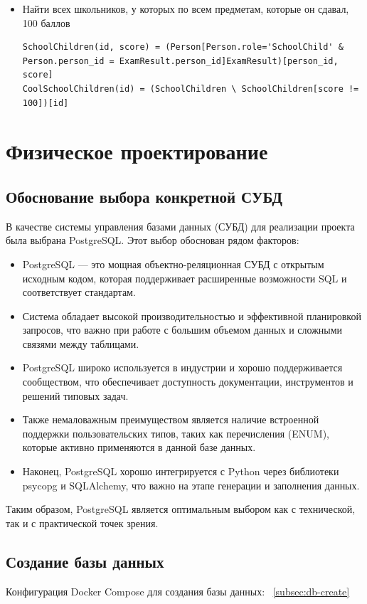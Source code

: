 \documentclass[a4paper]{article}
\begin{document}
\begin{itemize}
      \item Найти всех школьников, у которых по всем предметам, которые он сдавал, 100 баллов
            \begin{lstlisting}[basicstyle=\ttfamily\small, breaklines=true, frame=none, numbers=none]
SchoolChildren(id, score) = (Person[Person.role='SchoolChild' & Person.person_id = ExamResult.person_id]ExamResult)[person_id, score]
CoolSchoolChildren(id) = (SchoolChildren \ SchoolChildren[score != 100])[id]
            \end{lstlisting}
\end{itemize}


\section{Физическое проектирование}
\subsection{Обоснование выбора конкретной СУБД}
В качестве системы управления базами данных (СУБД) для реализации проекта была
выбрана PostgreSQL. Этот выбор обоснован рядом факторов:
\begin{itemize}
      \item PostgreSQL — это мощная объектно-реляционная СУБД с открытым исходным кодом, которая поддерживает расширенные возможности SQL и соответствует стандартам.
      \item Система обладает высокой производительностью и эффективной планировкой запросов, что важно при работе с большим объемом данных и сложными связями между таблицами.
      \item PostgreSQL широко используется в индустрии и хорошо поддерживается сообществом, что обеспечивает доступность документации, инструментов и решений типовых задач.
      \item Также немаловажным преимуществом является наличие встроенной поддержки пользовательских типов, таких как перечисления (ENUM), которые активно применяются в данной базе данных.
      \item Наконец, PostgreSQL хорошо интегрируется с Python через библиотеки psycopg и SQLAlchemy, что важно на этапе генерации и заполнения данных.
\end{itemize}

Таким образом, PostgreSQL является оптимальным выбором как с технической, так и с практической точек зрения.

\subsection{Создание базы данных}
Конфигурация Docker Compose для создания базы данных: ~\ref{subsec:db-create}
\end{document}
